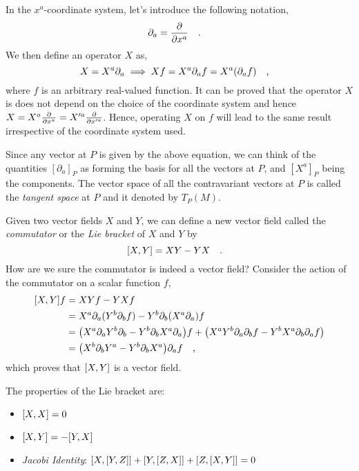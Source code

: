 \documentclass[a4paper,11pt]{article}
\begin{document}
In the $ x^a $-coordinate system, let's introduce the following notation,
\begin{equation}\label{key}
\partial_a = \pdv{x^a} \qq{.}
\end{equation}
We then define an operator $ X $ as,
\begin{equation}\label{key}
X = X^a \partial_a \implies Xf = X^a \partial_a f = X^a (\partial_a f) \qq{,}
\end{equation}
where $ f $ is an arbitrary real-valued function. It can be proved that the operator $ X $ is does not depend on the choice of the coordinate system and hence $ X = X^a \pdv{x^a} =X'^a \pdv{x'^a}  $. Hence, operating $ X $ on $ f $ will lead to the same result irrespective of the coordinate system used.

Since any vector at $ P $ is given by the above equation, we can think of the quantities $ [\partial_a]_P $ as forming the basis for all the vectors at $ P $, and $ [X^a]_P $ being the components. The vector space of all the contravariant vectors at $ P $ is called the \textit{tangent space} at $ P $ and it denoted by $T_P(M)$.

Given two vector fields $ X $ and $ Y $, we can define a new vector field called the \textit{commutator} or the \textit{Lie bracket} of $ X $ and $ Y $ by
\begin{equation}\label{key}
\qty[X, Y] = XY - YX \qq{.}
\end{equation}
How are we sure the commutator is indeed a vector field? Consider the action of the commutator on a scalar function $ f $,
\begin{align*}
	\qty[X, Y] f &= XYf - YXf \\
	&= X^a \partial_a ( Y^b \partial_b f  ) - Y^b \partial_b (X^a \partial_a ) f \\
	&=\qty(X^a \partial_a Y^b \partial_b    - Y^b \partial_b X^a \partial_a ) f  + \qty(X^a Y^b \partial_a  \partial_b f - Y^b X^a \partial_b \partial_a f) \\
	& = \qty(X^b \partial_b Y^a     - Y^b \partial_b X^a ) \partial_a f \qq{,} 
\end{align*}
which proves that $ \qty[X,Y] $ is a vector field.

The properties of the Lie bracket are:
\begin{itemize}
	\item  $ \qty[X,X] = 0 $
	\item $ \comm{X}{Y} = - \comm{Y}{X} $
	\item \textit{Jacobi Identity}: $ \comm{X}{\comm{Y}{Z}} + \comm{Y}{\comm{Z}{X}} + \comm{Z}{\comm{X}{Y}} = 0 $
\end{itemize}
\end{document}
